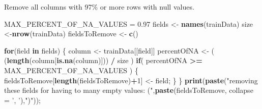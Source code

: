\documentclass[]{article}
\newenvironment{Shaded}{\begin{snugshade}}{\end{snugshade}}
\newcommand{\KeywordTok}[1]{\textcolor[rgb]{0.13,0.29,0.53}{\textbf{#1}}}
\newcommand{\DataTypeTok}[1]{\textcolor[rgb]{0.13,0.29,0.53}{#1}}
\newcommand{\DecValTok}[1]{\textcolor[rgb]{0.00,0.00,0.81}{#1}}
\newcommand{\FloatTok}[1]{\textcolor[rgb]{0.00,0.00,0.81}{#1}}
\newcommand{\StringTok}[1]{\textcolor[rgb]{0.31,0.60,0.02}{#1}}
\newcommand{\ControlFlowTok}[1]{\textcolor[rgb]{0.13,0.29,0.53}{\textbf{#1}}}
\newcommand{\OperatorTok}[1]{\textcolor[rgb]{0.81,0.36,0.00}{\textbf{#1}}}
\newcommand{\NormalTok}[1]{#1}
\begin{document}
Remove all columns with 97\% or more rows with null values.

\begin{Shaded}
\begin{Highlighting}[]
\NormalTok{MAX_PERCENT_OF_NA_VALUES =}\StringTok{ }\FloatTok{0.97}
\NormalTok{fields <-}\StringTok{ }\KeywordTok{names}\NormalTok{(trainData)}
\NormalTok{size <-}\KeywordTok{nrow}\NormalTok{(trainData)}
\NormalTok{fieldsToRemove <-}\StringTok{ }\KeywordTok{c}\NormalTok{()}

\ControlFlowTok{for}\NormalTok{(field }\ControlFlowTok{in}\NormalTok{ fields) \{}
\NormalTok{  column <-}\StringTok{ }\NormalTok{trainData[[field]]}
\NormalTok{  percentOfNA <-}\StringTok{ }\NormalTok{( (}\KeywordTok{length}\NormalTok{(column[}\KeywordTok{is.na}\NormalTok{(column)])) }\OperatorTok{/}\StringTok{ }\NormalTok{size )}
  \ControlFlowTok{if}\NormalTok{( percentOfNA }\OperatorTok{>=}\StringTok{ }\NormalTok{MAX_PERCENT_OF_NA_VALUES ) \{}
\NormalTok{    fieldsToRemove[}\KeywordTok{length}\NormalTok{(fieldsToRemove)}\OperatorTok{+}\DecValTok{1}\NormalTok{] <-}\StringTok{ }\NormalTok{field;}
\NormalTok{  \}}
\NormalTok{\}}
\KeywordTok{print}\NormalTok{(}\KeywordTok{paste}\NormalTok{(}\StringTok{"removing these fields for having to many empty values: ("}\NormalTok{,}\KeywordTok{paste}\NormalTok{(fieldsToRemove, }\DataTypeTok{collapse =} \StringTok{', '}\NormalTok{),}\StringTok{")"}\NormalTok{));}
\end{Highlighting}
\end{Shaded}
\end{document}
